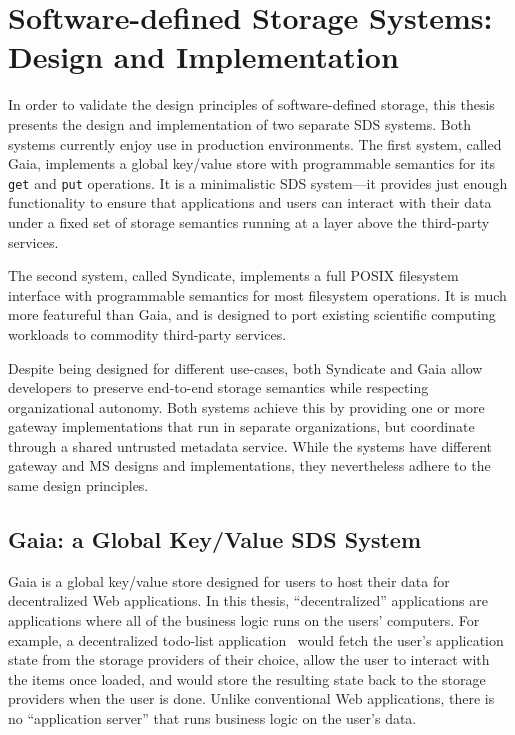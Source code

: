\chapter{Software-defined Storage Systems: Design and Implementation}
\label{chap:syndicate_sds}

In order to validate the design principles of software-defined storage, this 
thesis presents the design and implementation of two separate SDS systems.
Both systems currently enjoy use in production environments.
The first system, called Gaia, implements a global key/value store with programmable semantics for its
\texttt{get} and \texttt{put} operations.  It is a minimalistic SDS system---it
provides just enough functionality to ensure that applications and
users can interact with their data under a fixed set of storage
semantics running at a layer above the third-party services.

The second system, called Syndicate, implements
a full POSIX filesystem interface with programmable semantics for most
filesystem operations.  It is much more featureful than Gaia, and is designed
to port existing scientific computing workloads to commodity third-party
services.

Despite being designed for different use-cases, both Syndicate and Gaia allow
developers to preserve end-to-end storage semantics while respecting
organizational autonomy.  Both systems achieve this by providing one or more
gateway implementations that run in separate organizations, but
coordinate through a shared untrusted metadata service.  While the systems have
different gateway and MS designs and implementations, they nevertheless adhere to
the same design principles.

\section{Gaia: a Global Key/Value SDS System}

Gaia is a global key/value store designed for users to host their data
for decentralized Web applications.  In this thesis, ``decentralized''
applications are applications where all of the business logic runs on the
users' computers.  For example, a decentralized todo-list
application~\cite{blockstack-todo} would fetch the user's application state from
the storage providers of their choice, allow the user to interact with the items
once loaded, and would store the resulting state back to the storage providers
when the user is done.  Unlike conventional Web applications,
there is no ``application server'' that runs business logic on the user's data.

